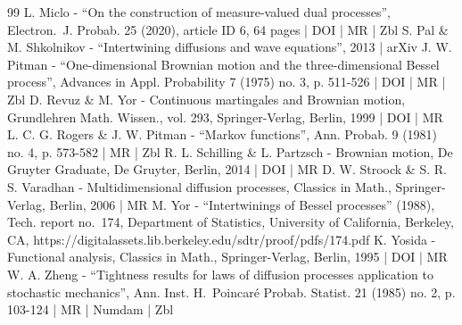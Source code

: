 \documentclass[10pt]{amsart}
\theoremstyle{plain}
\theoremstyle{definition}
\begin{document}
\begin{thebibliography}{99}
L. Miclo - “On the construction of measure-valued dual processes”, Electron. J. Probab. 25 (2020), article ID 6, 64 pages | DOI | MR | Zbl
S. Pal \& M. Shkolnikov - “Intertwining diffusions and wave equations”, 2013 | arXiv
J. W. Pitman - “One-dimensional Brownian motion and the three-dimensional Bessel process”, Advances in Appl. Probability 7 (1975) no. 3, p. 511-526 | DOI | MR | Zbl
D. Revuz \& M. Yor - Continuous martingales and Brownian motion, Grundlehren Math. Wissen., vol. 293, Springer-Verlag, Berlin, 1999 | DOI | MR
L. C. G. Rogers \& J. W. Pitman - “Markov functions”, Ann. Probab. 9 (1981) no. 4, p. 573-582 | MR | Zbl
R. L. Schilling \& L. Partzsch - Brownian motion, De Gruyter Graduate, De Gruyter, Berlin, 2014 | DOI | MR
D. W. Stroock \& S. R. S. Varadhan - Multidimensional diffusion processes, Classics in Math., Springer-Verlag, Berlin, 2006 | MR
M. Yor - “Intertwinings of Bessel processes” (1988), Tech. report no. 174, Department of Statistics, University of California, Berkeley, CA, https://digitalassets.lib.berkeley.edu/sdtr/proof/pdfs/174.pdf
K. Yosida - Functional analysis, Classics in Math., Springer-Verlag, Berlin, 1995 | DOI | MR
W. A. Zheng - “Tightness results for laws of diffusion processes application to stochastic mechanics”, Ann. Inst. H. Poincaré Probab. Statist. 21 (1985) no. 2, p. 103-124 | MR | Numdam | Zbl
\end{thebibliography}
\end{document}
